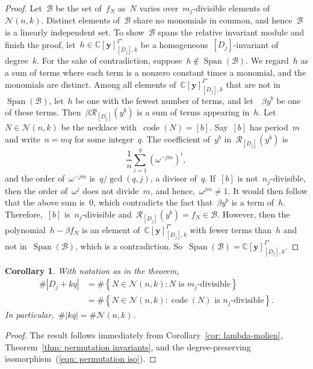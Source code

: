 \documentclass{amsart}
\newtheorem{cor}[thm]{Corollary}
\DeclareMathOperator{\Span}{Span}
\DeclareMathOperator{\code}{code}
\newcommand{\C}{\mathbb{C}}
\newcommand{\polyringy}{\C[\mathbf{y}]}
\newcommand{\neck}{\mathcal{N}}
\begin{document}
\begin{proof}
Let~$\mathcal{B}$ be the set of~$f_N$ as~$N$ varies over~$m_j$-divisible
elements of~$\neck(n,k)$.  Distinct elements of~$\mathcal{B}$ share no monomials
in common, and hence~$\mathcal{B}$ is a linearly independent set.  To
show~$\mathcal{B}$ spans the relative invariant module and finish the
proof, let~$h\in\polyringy^{\Gamma'}_{[D_j],k}$ be a
homogeneous~$[D_j]$-invariant of degree~$k$. For the sake of contradiction,
suppose~$h\notin\Span(\mathcal{B})$.  We regard~$h$ as a sum of terms where each
term is a nonzero constant times a monomial, and the monomials are distinct.
Among all elements of~$\polyringy^{\Gamma'}_{[D_j],k}$ that are
not in~$\Span(\mathcal{B})$, let~$h$ be one with the fewest number of terms, and
let~~$\beta y^b$ be one of these terms. Then~$\beta\mathcal{R}_{[D_j]}(y^b)$ is a
sum of terms appearing in~$h$.  Let~$N\in\neck(n,k)$ be the necklace
with~$\code(N)=[b]$.  Say~$[b]$ has period~$m$ and write~$n=mq$ for some
integer~$q$.  The coefficient of~$y^b$ in~$\mathcal{R}_{[D_j]}(y^b)$ is
\[
  \frac{1}{n}\sum_{i=1}^q(\omega^{-jm})^i,
\]
and the order of~$\omega^{-jm}$ is~$q/\gcd(q,j)$, a divisor of~$q$.
If~$[b]$ is not~$n_j$-divisible, then the order of~$\omega^j$ does not
divide~$m$, and hence,~$\omega^{jm}\neq1$.  It would then follow that the above sum
is~$0$, which contradicts the fact that~$\beta y^b$ is a term of~$h$.
Therefore,~$[b]$ is~$n_j$-divisible
and~$\mathcal{R}_{[D_j]}(y^b)=f_N\in\mathcal{B}$.  However, then the polynomial~$h-\beta f_N$
is an element of~$\polyringy^{\Gamma'}_{[D_j],k}$ with fewer terms
than~$h$ and not in~$\Span(\mathcal{B})$, which is a contradiction.
So~$\Span(\mathcal{B})=\polyringy^{\Gamma'}_{[D_j],k}$.
\end{proof}

\begin{cor}\label{cor: permutation invariants} With notation as in the theorem,
\begin{align*}
  \#|D_j+kq|&=  \#\left\{ N\in\neck(n,k):\text{$N$ is~$m_j$-divisible} \right\}\\[5pt]
	    &=  \#\left\{ N\in\neck(n,k):\text{$\code(N)$ is~$n_j$-divisible}
	    \right\}.
\end{align*}
In particular,~$\#|kq|=\#\neck(n,k)$.
\end{cor}

\begin{proof} The result follows immediately from Corollary~\ref{cor:
  lambda-molien}, Theorem~\ref{thm: permutation invariants}, and the
degree-preserving isomorphism~(\ref{eqn: permutation iso}).
\end{proof}
\end{document}
